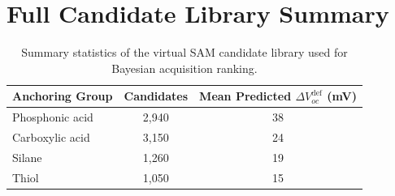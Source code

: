 \section{Full Candidate Library Summary}

\begin{table}[htbp]
\centering
\caption{Summary statistics of the virtual SAM candidate library used for
Bayesian acquisition ranking.}
\label{tab:appendix}
\begin{tabular}{@{}lcc@{}}
\toprule
\textbf{Anchoring Group} & \textbf{Candidates} & \textbf{Mean Predicted $\Delta V_{oc}^{\text{def}}$ (mV)} \\
\midrule
Phosphonic acid & 2{,}940 & 38 \\
Carboxylic acid & 3{,}150 & 24 \\
Silane & 1{,}260 & 19 \\
Thiol & 1{,}050 & 15 \\
\bottomrule
\end{tabular}
\end{table}
